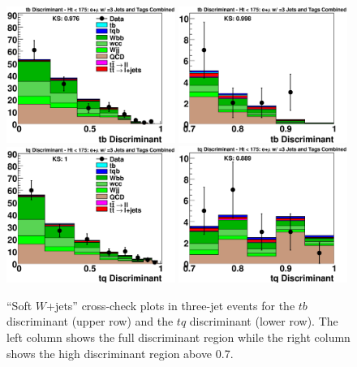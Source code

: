 \clearpage
\begin{figure}[!h!tbp]
\includegraphics[width=0.49\textwidth]
{eps/MatrixElement/cross_check/combined/3jet/Wjets_tb_Discriminant}
\includegraphics[width=0.49\textwidth]
{eps/MatrixElement/cross_check/combined/3jet/Wjets_tb_Discriminant_Zoom}
\includegraphics[width=0.49\textwidth]
{eps/MatrixElement/cross_check/combined/3jet/Wjets_tq_Discriminant}
\includegraphics[width=0.49\textwidth]
{eps/MatrixElement/cross_check/combined/3jet/Wjets_tq_Discriminant_Zoom}
\vspace{-0.1in}
\caption{``Soft $W$+jets'' cross-check plots in three-jet
events for the $tb$ discriminant (upper row) and the $tq$ discriminant
(lower row). The left column shows the full discriminant region while
the right column shows the high discriminant region above 0.7.}
\label{wjets-cross-3jet}
\end{figure}

